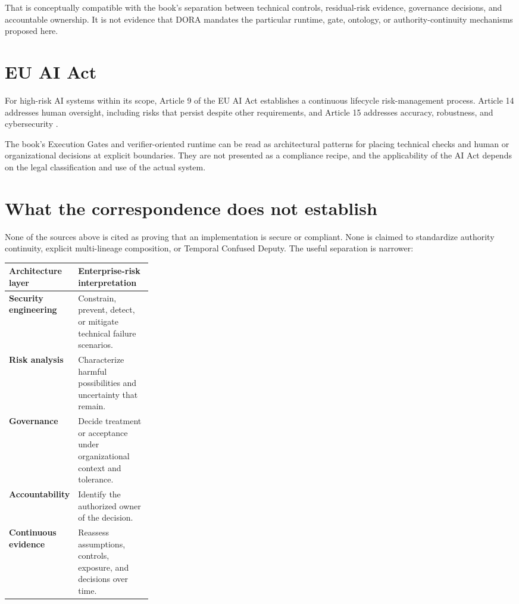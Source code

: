 \documentclass[10pt,oneside,openany]{book}
\begin{document}
That is conceptually compatible with the book's separation between technical controls, residual-risk evidence, governance decisions, and accountable ownership. It is not evidence that DORA mandates the particular runtime, gate, ontology, or authority-continuity mechanisms proposed here.

\section{EU AI Act}
For high-risk AI systems within its scope, Article 9 of the EU AI Act establishes a continuous lifecycle risk-management process. Article 14 addresses human oversight, including risks that persist despite other requirements, and Article 15 addresses accuracy, robustness, and cybersecurity \cite{aiact2024}.

The book's Execution Gates and verifier-oriented runtime can be read as architectural patterns for placing technical checks and human or organizational decisions at explicit boundaries. They are not presented as a compliance recipe, and the applicability of the AI Act depends on the legal classification and use of the actual system.

\section{What the correspondence does not establish}
None of the sources above is cited as proving that an implementation is secure or compliant. None is claimed to standardize authority continuity, explicit multi-lineage composition, or Temporal Confused Deputy. The useful separation is narrower:

\begin{center}
\small
\begin{tabularx}{0.95\linewidth}{>{\bfseries}p{0.28\linewidth} Y}
\toprule
Architecture layer & Enterprise-risk interpretation \\
\midrule
Security engineering & Constrain, prevent, detect, or mitigate technical failure scenarios. \\
Risk analysis & Characterize harmful possibilities and uncertainty that remain. \\
Governance & Decide treatment or acceptance under organizational context and tolerance. \\
Accountability & Identify the authorized owner of the decision. \\
Continuous evidence & Reassess assumptions, controls, exposure, and decisions over time. \\
\bottomrule
\end{tabularx}
\end{center}
\end{document}
